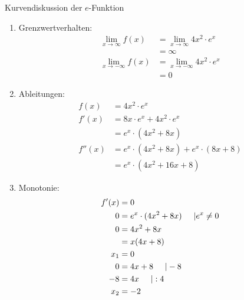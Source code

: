 \begin{bsp}{Kurvendiskussion der $e$-Funktion}{}
\begin{enumerate}
    \item Grenzwertverhalten:
    \begin{equation*}
            \begin{split}
               \lim_{x\longrightarrow \infty} f(x) &= \lim_{x\longrightarrow \infty} 4x^2\cdot e^x\\
               &=  \infty\\
               \lim_{x\longrightarrow -\infty} f(x) &= \lim_{x\longrightarrow -\infty} 4x^2\cdot e^x\\
               &= 0          
            \end{split}
        \end{equation*}
    \item Ableitungen:
    \begin{equation*}
            \begin{split}
               f(x) &= 4x^2\cdot e^x\\
               f'(x) &= 8x\cdot e^x + 4x^2 \cdot e^x\\
                    &= e^x \cdot (4x^2+8x)\\
                f''(x) &= e^x \cdot (4x^2+8x) + e^x \cdot (8x+8)\\
                 &= e^x\cdot (4x^2 +16x+8)
            \end{split}
        \end{equation*}
        \item Monotonie:
            \begin{equation*}
            \begin{split}
                f'(x)&=0\\
                0&= e^x \cdot (4x^2+8x) \hspace{0.5cm} | e^x \neq 0\\
                0&= 4x^2+8x\\
                &= x(4x+8)\\
                x_1 &= 0\\
                0&= 4x+8\hspace{0.5cm} | -8\\ 
                -8&= 4x \hspace{0.5cm} | :4\\
                x_2 &= -2
            \end{split}
        \end{equation*}
        \begin{center}\begin{tabular}{||c|c|c|c|c|c||}

\end{tabular}
\end{center}
\end{enumerate}
\end{bsp}
